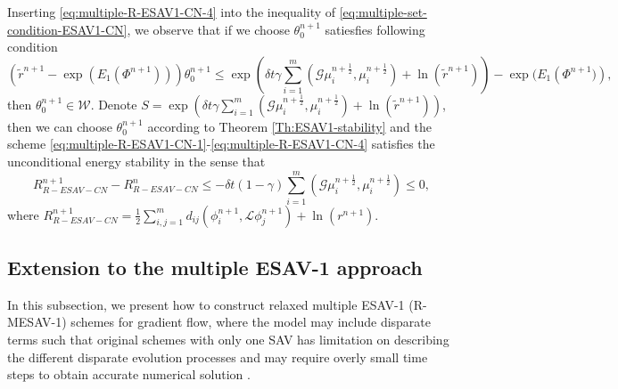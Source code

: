 \documentclass[final,review,onefignum,onetabnum]{siamart190516}
\theoremstyle{plain}
\begin{document}
Inserting \eqref{eq:multiple-R-ESAV1-CN-4} into the inequality of \eqref{eq:multiple-set-condition-ESAV1-CN}, we observe that if we choose  $\theta_0^{n+1}$ satiesfies following condition
\begin{equation}\label{eq:multiple-ESAV1-cond_zeta-CN}
\left(\tilde{r}^{n+1}-\exp\left(E_{1}\left(\Phi^{n+1}\right)\right)\right)\theta_0^{n+1} \leq \exp \left(\delta t \gamma \sum_{i=1}^{m}\left(\mathcal{G} \mu_{i}^{n+\frac{1}{2}}, \mu_{i}^{n+\frac{1}{2}}\right) + \ln(\tilde{r}^{n+1})\right)-\exp(E_{1}\left(\Phi^{n+1})\right),
\end{equation}
then $\theta_0^{n+1}\in \mathcal{W}$. 
Denote $S=\exp \left(\delta t \gamma \sum_{i=1}^{m}\left(\mathcal{G} \mu_{i}^{n+\frac{1}{2}}, \mu_{i}^{n+\frac{1}{2}}\right) + \ln(\tilde{r}^{n+1})\right)$, then we can choose $\theta_{0}^{n+1}$ according to Theorem \ref{Th:ESAV1-stability} and the scheme \eqref{eq:multiple-R-ESAV1-CN-1}-\eqref{eq:multiple-R-ESAV1-CN-4} satisfies the unconditional energy stability in the sense that
\begin{equation}\label{eq:multiple-ESAV1-stability-CN}
	R_{R-ESAV-CN}^{n+1} - R_{R-ESAV-CN}^{n} \leq -\delta t (1-\gamma) \sum_{i=1}^{m}\left(\mathcal{G} \mu_{i}^{n+\frac{1}{2}}, \mu_{i}^{n+\frac{1}{2}}\right) \leq 0,
\end{equation}
where $R_{R-ESAV-CN}^{n+1}=\frac{1}{2} \sum_{i, j=1}^{m} d_{i j}\left(\phi_{i}^{n+1}, \mathcal{L} \phi_{j}^{n+1}\right) +\ln(r^{n+1})$.


\subsection{Extension to the multiple ESAV-1 approach}
 \label{sec:R-ESAV-multiple}
 In this subsection, we present how to construct relaxed multiple ESAV-1 (R-MESAV-1) schemes for gradient flow, where the model may include disparate terms such that original schemes with only one SAV has limitation on describing the different disparate evolution processes and may require overly small time steps to obtain accurate numerical solution \cite{cheng2018multiple}.
 
\end{document}
